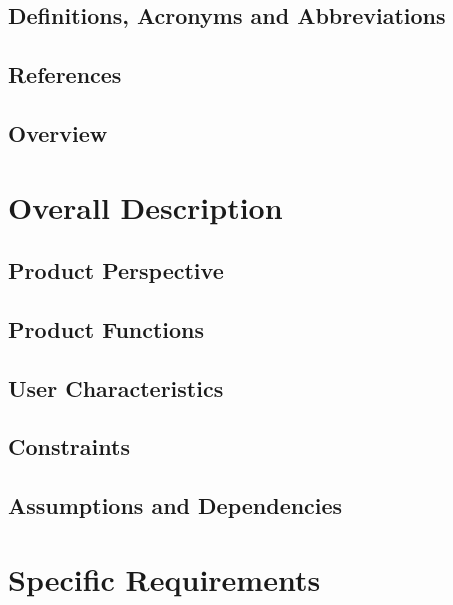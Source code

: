 \documentclass{article}
\begin{document}
	\subsection{Definitions, Acronyms and Abbreviations}
	
	
	\subsection{References}
	
	
	\subsection{Overview}
	
	
\section{Overall Description}
	\subsection{Product Perspective}
	

	\subsection{Product Functions}
	
	
	\subsection{User Characteristics}
	
	
	\subsection{Constraints}
	
	
	\subsection{Assumptions and Dependencies}
	
	
\section{Specific Requirements}
\end{document}
